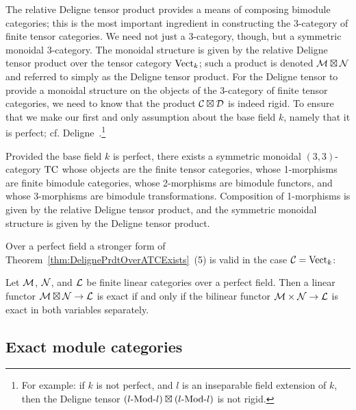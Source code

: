 \documentclass{amsart}
\begin{document}
The relative Deligne tensor product provides a means of composing bimodule categories; this is the most important ingredient in constructing the 3-category of finite tensor categories.  We need not just a 3-category, though, but a symmetric monoidal 3-category.  The monoidal structure is given by the relative Deligne tensor product over the tensor category $\mathrm{Vect}_k$; such a product is denoted $\mathcal M \boxtimes \mathcal N$ and referred to simply as the Deligne tensor product.  For the Deligne tensor to provide a monoidal structure on the objects of the 3-category of finite tensor categories, we need to know that the product $\mathcal C \boxtimes \mathcal D$ is indeed rigid.  To ensure that we make our first and only assumption about the base field $k$, namely that it is perfect; cf. Deligne~\cite[Prop 5.17]{deligne}.\footnote{For example: if $k$ is not perfect, and $l$ is an inseparable field extension of $k$, then the Deligne tensor $(\Mod{l}{l}) \boxtimes (\Mod{l}{l})$ is not rigid.} %

\begin{theorem}[\cite{3TC}] \label{thm:tcexists}
Provided the base field $k$ is perfect, there exists a symmetric monoidal $(3,3)$-category $\mathrm{TC}$ whose objects are the finite tensor categories, whose 1-morphisms are finite bimodule categories, whose 2-morphisms are bimodule functors, and whose 3-morphisms are bimodule transformations.  Composition of 1-morphisms is given by the relative Deligne tensor product, and the symmetric monoidal structure is given by the Deligne tensor product.
\end{theorem}

\nid Over a perfect field a stronger form of Theorem~\ref{thm:DelignePrdtOverATCExists}~(5) is valid in the case $\mathcal C = \mathrm{Vect}_k$:

\begin{lemma}\label{lem:Exact_in_each_is_exact}
	Let $\mathcal M$, $\mathcal N$, and $\mathcal L$ be finite linear categories over a perfect field. Then a linear functor $\mathcal M \boxtimes \mathcal N \to \mathcal L$ is exact if and only if the bilinear functor $\mathcal M \times \mathcal N \to \mathcal L$ is exact in both variables separately. 
\end{lemma} 

\subsection{Exact module categories} \label{sec:tc-exact}
\end{document}
